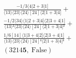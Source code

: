 \documentclass[varwidth, border=5pt]{standalone}
\begin{document}
\begin{my}
$\begin{gathered}
\scriptscriptstyle\frac{-1/3⟨4|2+3|1]}{⟨13⟩⟨23⟩⟨24⟩[24]⟨2|1+3|4]} +\\
\scriptscriptstyle\frac{-1/2⟨34⟩⟨1|2+3|4]⟨2|3+4|1]}{⟨13⟩²⟨23⟩⟨24⟩[24]⟨2|1+3|4]²} +\\
\scriptscriptstyle\frac{1/6[14]⟨1|3+4|2]⟨2|3+4|1]}{⟨13⟩⟨23⟩⟨24⟩[24]²⟨2|1+3|4]²} +\\
\scriptscriptstyle(3214𝟓,\;\text{False}) \phantom{+}
\end{gathered}$
\end{my}
\end{document}
